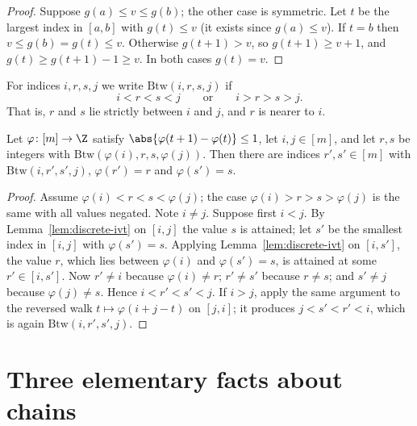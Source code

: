 \begin{proof}
Suppose $g(a)\le v\le g(b)$; the other case is symmetric. Let $t$ be the largest index in
$[a,b]$ with $g(t)\le v$ (it exists since $g(a)\le v$). If $t=b$ then $v\le g(b)=g(t)\le v$.
Otherwise $g(t+1)>v$, so $g(t+1)\ge v+1$, and $g(t)\ge g(t+1)-1\ge v$. In both cases
$g(t)=v$.
\end{proof}


\begin{definition}\label{def:between}
For indices $i,r,s,j$ we write $\mathrm{Btw}(i,r,s,j)$ if
\[
i<r<s<j\qquad\text{or}\qquad i>r>s>j .
\]
That is, $r$ and $s$ lie strictly between $i$ and $j$, and $r$ is nearer to $i$.
\end{definition}


\begin{lemma}\label{lem:values-between}
Let $\varphi\colon[m]\to\Z$ satisfy $\abs{\varphi(t+1)-\varphi(t)}\le1$, let $i,j\in[m]$, and let
$r,s$ be integers with $\mathrm{Btw}(\varphi(i),r,s,\varphi(j))$. Then there are indices
$r',s'\in[m]$ with $\mathrm{Btw}(i,r',s',j)$, $\varphi(r')=r$ and $\varphi(s')=s$.
\end{lemma}

\begin{proof}
Assume $\varphi(i)<r<s<\varphi(j)$; the case $\varphi(i)>r>s>\varphi(j)$ is the same with all
values negated. Note $i\neq j$. Suppose first $i<j$. By Lemma~\ref{lem:discrete-ivt} on
$[i,j]$ the value $s$ is attained; let $s'$ be the smallest index in $[i,j]$ with
$\varphi(s')=s$. Applying Lemma~\ref{lem:discrete-ivt} on $[i,s']$, the value $r$, which lies
between $\varphi(i)$ and $\varphi(s')=s$, is attained at some $r'\in[i,s']$. Now $r'\neq i$
because $\varphi(i)\neq r$; $r'\neq s'$ because $r\neq s$; and $s'\neq j$ because
$\varphi(j)\neq s$. Hence $i<r'<s'<j$. If $i>j$, apply the same argument to the reversed walk
$t\mapsto\varphi(i+j-t)$ on $[j,i]$; it produces $j<s'<r'<i$, which is again
$\mathrm{Btw}(i,r',s',j)$.
\end{proof}


\section{Three elementary facts about chains}

